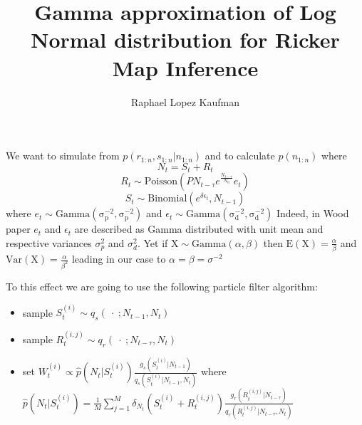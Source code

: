 \documentclass{article}
\title{Gamma approximation of Log Normal distribution for Ricker Map Inference}
\author{Raphael Lopez Kaufman}
\date{}
\begin{document}
	We want to simulate from $p(r_{1:n}, s_{1:n} | n_{1:n})$ and to calculate $p(n_{1:n})$ where
	\begin{equation*}
		N_t = S_t + R_t
	\end{equation*}
	\begin{equation*}
		R_t \sim \mathrm{Poisson}(PN_{t-\tau}e^{\frac{N_{t-\tau}}{N_0}}e_t)
	\end{equation*}
	\begin{equation*}
	S_t \sim \mathrm{Binomial}(e^{\delta\epsilon_t}, N_{t-1})
	\end{equation*}
	where $e_t \sim \mathrm{Gamma(\sigma_p^{-2}, \sigma_p^{-2})}$ and $\epsilon_t \sim \mathrm{Gamma(\sigma_d^{-2}, \sigma_d^{-2})}$ Indeed, in Wood paper $e_t$ and $\epsilon_t$ are described as Gamma distributed with unit mean and respective variances $\sigma_p^2$ and $\sigma_d^2$. Yet if $\mathrm{X} \sim \mathrm{Gamma}(\alpha, \beta)$ then $\mathrm{E}(\mathrm{X}) = \frac{\alpha}{\beta}$ and $\mathrm{Var}(\mathrm{X}) = \frac{\alpha}{\beta^2}$ leading in our case to $\alpha=\beta=\sigma^{-2}$
	
	To this effect we are going to use the following particle filter algorithm:
	\begin{itemize}
		\item sample $S_t^{(i)} \sim q_s(\ \cdot \ ; N_{t-1}, N_t)$
		\item sample $R_t^{(i,j)} \sim q_r(\ \cdot \ ; N_{t-\tau}, N_t)$
		\item set $W_t^{(i)} \propto \hat{p}(N_t |S_t^{(i)})\frac{g_s(S_t^{(i)} | N_{t-1})}{q_s(S_t^{(i)} | N_{t-1}, N_t)}$
		where $\hat{p}(N_t |S_t^{(i)}) = \frac{1}{M}\sum_{j=1}^{M}\delta_{N_t}(S_t^{(i)}+R_t^{(i,j)})\frac{g_r(R_t^{(i,j)} | N_{t-\tau})}{q_r( R_t^{(i,j)}| N_{t-\tau}, N_t)}$
	\end{itemize}
	
\end{document}
